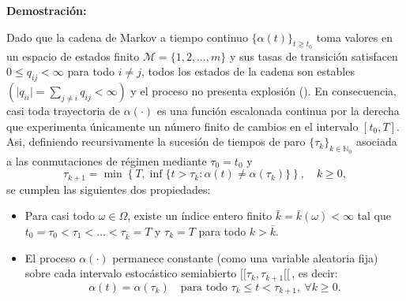 \documentclass[
  spanish,
  letterpaper,
  DIV=11,
  numbers=noendperiod]{scrreprt}
\providecommand{\tightlist}{%
  \setlength{\itemsep}{0pt}\setlength{\parskip}{0pt}}
\theoremstyle{plain}
\theoremstyle{plain}
\theoremstyle{plain}
\theoremstyle{definition}
\theoremstyle{remark}
\begin{document}
\textbf{Demostración:}

Dado que la cadena de Markov a tiempo continuo
\(\{\alpha(t)\}_{t \ge t_0}\) toma valores en un espacio de estados
finito \(\mathcal{M} = \{1, 2, \dots, m\}\) y sus tasas de transición
satisfacen \(0 \le q_{ij} < \infty\) para todo \(i \neq j\), todos los
estados de la cadena son estables
\(\left( \displaystyle \vert q_{ii} \vert = \sum_{j \neq i} q_{ij} < \infty \right)\)
y el proceso no presenta explosión (). En consecuencia, casi toda trayectoria de
\(\alpha(\cdot)\) es una función escalonada continua por la derecha que
experimenta únicamente un número finito de cambios en el intervalo
\([t_0, T]\). Asi, definiendo recursivamente la sucesión de tiempos de
paro \(\{\tau_k\}_{k \in \mathbb{N}_0}\) asociada a las conmutaciones de
régimen mediante \(\tau_0 = t_0\) y \[
\tau_{k+1} = \min\left\{T, \inf\{t > \tau_k : \alpha(t) \neq \alpha(\tau_k)\}\right\}, \quad k \ge 0,
\] se cumplen las siguientes dos propiedades:

\begin{itemize}
\tightlist
\item
  Para casi todo \(\omega \in \Omega\), existe un índice entero finito
  \(\bar{k} = \bar{k}(\omega) < \infty\) tal que
  \(t_0 = \tau_0 < \tau_1 < \dots < \tau_{\bar{k}} = T\) y
  \(\tau_k = T\) para todo \(k > \bar{k}\).
\item
  El proceso \(\alpha(\cdot)\) permanece constante (como una variable
  aleatoria fija) sobre cada intervalo estocástico semiabierto
  \([[\tau_k, \tau_{k+1}[[\,\), es decir: \[
  \alpha(t) = \alpha(\tau_k) \quad \text{para todo } \tau_k \le t < \tau_{k+1}, \ \forall k \ge 0.
  \]
\end{itemize}
\end{document}
